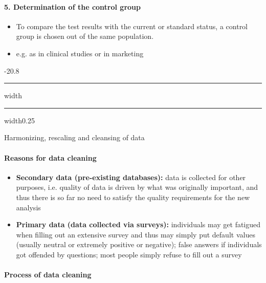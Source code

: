 \documentclass[a4paper, landscape, 6pt, fleqn]{scrartcl}
\makeatletter
\renewcommand{\emph}[1]{\textbf{#1}}
\renewcommand{\subsection}{\@startsection{subsection}{1}{0mm}%
{-2\baselineskip}{0.8\baselineskip}%
{\hrule depth 0.2pt width\columnwidth\hrule depth0.75pt
width0.25\columnwidth\vspace*{1.2em}\large\bfseries}}
\makeatother
\begin{document}
\begin{multicols*}{4}
\paragraph{5. Determination of the control group}

\begin{itemize}
\item To compare the test results with the current or standard status, a control group is chosen out of the same population.
\item e.g. as in clinical studies or in marketing
\end{itemize}

\subsection{Harmonizing, rescaling and cleansing of data}

\paragraph{Reasons for data cleaning}

\begin{itemize}
\item \emph{Secondary data (pre-existing databases):} data is collected for other purposes, i.e. quality of data is driven by what was originally important, and thus there is so far no need to satisfy the quality requirements for the new analysis
\item \emph{Primary data (data collected via surveys):} individuals may get fatigued when filling out an extensive survey and thus may simply put default values (usually neutral or extremely positive or negative); false answers if individuals got offended by questions; most people simply refuse to fill out a survey
\end{itemize}

\paragraph{Process of data cleaning}


\end{multicols*}
\end{document}
